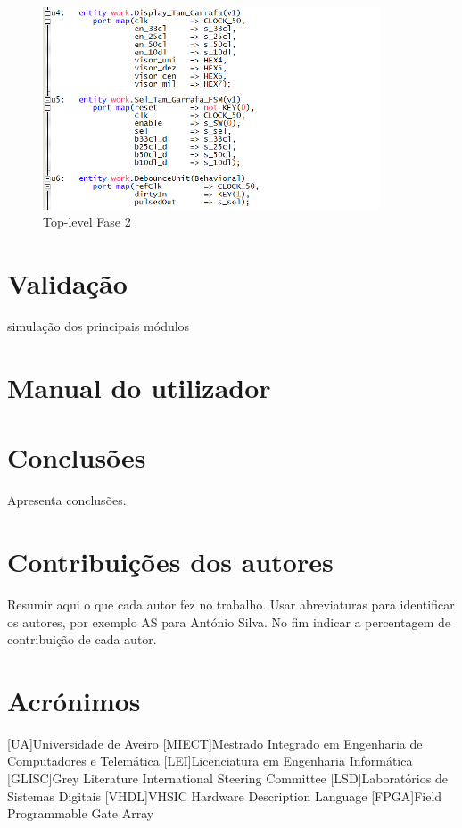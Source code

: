 \documentclass{report}
\begin{document}
\begin{figure}[H]
    \centering
    \includegraphics[width = 10cm]{TopLevelF2.png}
    \caption{Top-level Fase 2}
    \label{fig:TL2}
\end{figure}

\chapter{Validação}
\label{chap.validação}
simulação dos principais módulos

\chapter{Manual do utilizador}


\chapter{Conclusões}
\label{chap.conclusao}
Apresenta conclusões.

\chapter*{Contribuições dos autores}
Resumir aqui o que cada autor fez no trabalho.
Usar abreviaturas para identificar os autores,
por exemplo AS para António Silva.
No fim indicar a percentagem de contribuição de cada autor.

\chapter*{Acrónimos}
\begin{acronym}
[UA]{Universidade de Aveiro}
[MIECT]{Mestrado Integrado em Engenharia de Computadores e Telemática}
[LEI]{Licenciatura em Engenharia Informática}
[GLISC]{Grey Literature International Steering Committee}
[LSD]{Laboratórios de Sistemas Digitais}
[VHDL]{VHSIC Hardware Description Language}
[FPGA]{Field Programmable Gate Array}
\end{acronym}


\printbibliography
\end{document}
